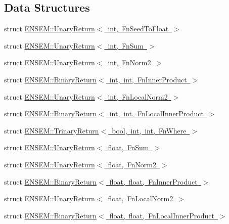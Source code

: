 \subsection*{Data Structures}
\begin{DoxyCompactItemize}
\item 
struct \mbox{\hyperlink{structENSEM_1_1UnaryReturn_3_01int_00_01FnSeedToFloat_01_4}{E\+N\+S\+E\+M\+::\+Unary\+Return$<$ int, Fn\+Seed\+To\+Float $>$}}
\item 
struct \mbox{\hyperlink{structENSEM_1_1UnaryReturn_3_01int_00_01FnSum_01_4}{E\+N\+S\+E\+M\+::\+Unary\+Return$<$ int, Fn\+Sum $>$}}
\item 
struct \mbox{\hyperlink{structENSEM_1_1UnaryReturn_3_01int_00_01FnNorm2_01_4}{E\+N\+S\+E\+M\+::\+Unary\+Return$<$ int, Fn\+Norm2 $>$}}
\item 
struct \mbox{\hyperlink{structENSEM_1_1BinaryReturn_3_01int_00_01int_00_01FnInnerProduct_01_4}{E\+N\+S\+E\+M\+::\+Binary\+Return$<$ int, int, Fn\+Inner\+Product $>$}}
\item 
struct \mbox{\hyperlink{structENSEM_1_1UnaryReturn_3_01int_00_01FnLocalNorm2_01_4}{E\+N\+S\+E\+M\+::\+Unary\+Return$<$ int, Fn\+Local\+Norm2 $>$}}
\item 
struct \mbox{\hyperlink{structENSEM_1_1BinaryReturn_3_01int_00_01int_00_01FnLocalInnerProduct_01_4}{E\+N\+S\+E\+M\+::\+Binary\+Return$<$ int, int, Fn\+Local\+Inner\+Product $>$}}
\item 
struct \mbox{\hyperlink{structENSEM_1_1TrinaryReturn_3_01bool_00_01int_00_01int_00_01FnWhere_01_4}{E\+N\+S\+E\+M\+::\+Trinary\+Return$<$ bool, int, int, Fn\+Where $>$}}
\item 
struct \mbox{\hyperlink{structENSEM_1_1UnaryReturn_3_01float_00_01FnSum_01_4}{E\+N\+S\+E\+M\+::\+Unary\+Return$<$ float, Fn\+Sum $>$}}
\item 
struct \mbox{\hyperlink{structENSEM_1_1UnaryReturn_3_01float_00_01FnNorm2_01_4}{E\+N\+S\+E\+M\+::\+Unary\+Return$<$ float, Fn\+Norm2 $>$}}
\item 
struct \mbox{\hyperlink{structENSEM_1_1BinaryReturn_3_01float_00_01float_00_01FnInnerProduct_01_4}{E\+N\+S\+E\+M\+::\+Binary\+Return$<$ float, float, Fn\+Inner\+Product $>$}}
\item 
struct \mbox{\hyperlink{structENSEM_1_1UnaryReturn_3_01float_00_01FnLocalNorm2_01_4}{E\+N\+S\+E\+M\+::\+Unary\+Return$<$ float, Fn\+Local\+Norm2 $>$}}
\item 
struct \mbox{\hyperlink{structENSEM_1_1BinaryReturn_3_01float_00_01float_00_01FnLocalInnerProduct_01_4}{E\+N\+S\+E\+M\+::\+Binary\+Return$<$ float, float, Fn\+Local\+Inner\+Product $>$}}

\end{DoxyCompactItemize}
